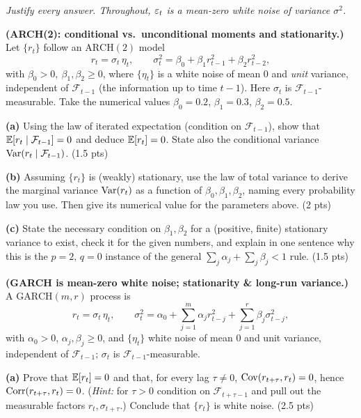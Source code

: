 \documentclass[11pt]{article}
\newcommand{\F}{\mathcal{F}}
\begin{document}
\pointstable
\begin{center}\itshape Justify every answer. Throughout, $\varepsilon_t$ is a mean-zero white noise of variance $\sigma^2$.\end{center}

\textbf{(ARCH(2): conditional vs.\ unconditional moments and stationarity.)} Let $\{r_t\}$ follow an $\mathrm{ARCH}(2)$ model
\[
r_t=\sigma_t\,\eta_t ,\qquad
\sigma_t^2=\beta_0+\beta_1 r_{t-1}^2+\beta_2 r_{t-2}^2 ,
\]
with $\beta_0>0,\ \beta_1,\beta_2\ge0$, where $\{\eta_t\}$ is a white noise of mean $0$ and \emph{unit} variance, independent of $\F_{t-1}$ (the information up to time $t-1$). Here $\sigma_t$ is $\F_{t-1}$-measurable. Take the numerical values $\beta_0=0.2$, $\beta_1=0.3$, $\beta_2=0.5$.

\textbf{(a)} Using the law of iterated expectation (condition on $\F_{t-1}$), show that $\E[r_t\mid\F_{t-1}]=0$ and deduce $\mathbb{E}[r_t]=0$. State also the conditional variance $\Var(r_t\mid\F_{t-1})$. \hfill(1.5 pts)

\textbf{(b)} Assuming $\{r_t\}$ is (weakly) stationary, use the law of total variance to derive the marginal variance $\operatorname{Var}(r_t)$ as a function of $\beta_0,\beta_1,\beta_2$, naming every probability law you use. Then give its numerical value for the parameters above. \hfill(2 pts)

\textbf{(c)} State the necessary condition on $\beta_1,\beta_2$ for a (positive, finite) stationary variance to exist, check it for the given numbers, and explain in one sentence why this is the $p=2,\,q=0$ instance of the general $\sum_j\alpha_j+\sum_j\beta_j<1$ rule. \hfill(1.5 pts)
\answerpage

\textbf{(GARCH is mean-zero white noise; stationarity \& long-run variance.)} A $\mathrm{GARCH}(m,r)$ process is
\[
r_t=\sigma_t\,\eta_t ,\qquad
\sigma_t^2=\alpha_0+\sum_{j=1}^{m}\alpha_j r_{t-j}^2+\sum_{j=1}^{r}\beta_j\sigma_{t-j}^2 ,
\]
with $\alpha_0>0$, $\alpha_j,\beta_j\ge0$, and $\{\eta_t\}$ white noise of mean $0$ and unit variance, independent of $\F_{t-1}$; $\sigma_t$ is $\F_{t-1}$-measurable.

\textbf{(a)} Prove that $\mathbb{E}[r_t]=0$ and that, for every lag $\tau\neq0$, $\operatorname{Cov}(r_{t+\tau},r_t)=0$, hence $\operatorname{Corr}(r_{t+\tau},r_t)=0$. (\emph{Hint:} for $\tau>0$ condition on $\F_{t+\tau-1}$ and pull out the measurable factors $r_t,\sigma_{t+\tau}$.) Conclude that $\{r_t\}$ is white noise. \hfill(2.5 pts)
\end{document}
